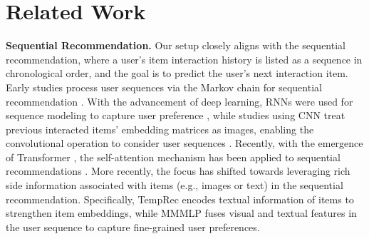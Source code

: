\documentclass[sigconf]{acmart}
\begin{document}
\section{Related Work}
\noindent\textbf{Sequential Recommendation. }
Our setup closely aligns with the sequential recommendation, where a user's item interaction history is listed as a sequence in chronological order, and the goal is to predict the user's next interaction item. Early studies process user sequences via the Markov chain for sequential recommendation \cite{he2016fusing,mahmood2007learning,wang2015learning}. With the advancement of deep learning, RNNs were used for sequence modeling to capture user preference \cite{hidasi2015session,li2017neural}, while studies using CNN treat previous interacted items' embedding matrices as images, enabling the convolutional operation to consider user sequences \cite{tang2018personalized,yuan2019simple,kim2016convolutional}.
Recently, with the emergence of Transformer \cite{vaswani2017attention}, the self-attention mechanism has been applied to sequential recommendations \cite{kang2018self,sun2019bert4rec,xu2021long}. More recently, the focus has shifted towards leveraging rich side information associated with items (e.g., images or text) in the sequential recommendation. Specifically, TempRec \cite{wu2022news} encodes textual information of items to strengthen item embeddings, while MMMLP \cite{liang2023mmmlp} fuses visual and textual features in the user sequence to capture fine-grained user preferences. 

\end{document}
